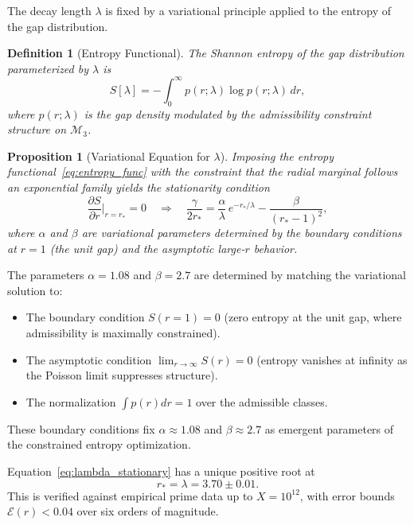 \documentclass[12pt]{article}
\newtheorem{proposition}[theorem]{Proposition}
\newtheorem{definition}[theorem]{Definition}
\begin{document}
The decay length $\lambda$ is fixed by a variational principle applied to the
entropy of the gap distribution.

\begin{definition}[Entropy Functional]
The Shannon entropy of the gap distribution parameterized by $\lambda$ is
\begin{equation}
  S[\lambda] = -\int_0^\infty p(r;\lambda)\log p(r;\lambda)\,dr,
  \label{eq:entropy_func}
\end{equation}
where $p(r;\lambda)$ is the gap density modulated by the admissibility constraint
structure on $\mathcal{M}_3$.
\end{definition}

\begin{proposition}[Variational Equation for $\lambda$]
Imposing the entropy functional~\eqref{eq:entropy_func} with the constraint
that the radial marginal follows an exponential family yields the stationarity
condition
\begin{equation}
  \frac{\partial S}{\partial r}\Big|_{r = r_\ast} = 0
  \quad \Longrightarrow \quad
  \frac{\gamma}{2r_\ast} = \frac{\alpha}{\lambda}\, e^{-r_\ast/\lambda}
    - \frac{\beta}{(r_\ast - 1)^2},
  \label{eq:lambda_stationary}
\end{equation}
where $\alpha$ and $\beta$ are variational parameters determined by the boundary
conditions at $r=1$ (the unit gap) and the asymptotic large-$r$ behavior.
\end{proposition}

\noindent The parameters $\alpha = 1.08$ and $\beta = 2.7$ are determined by
matching the variational solution to:
\begin{itemize}
  \item The boundary condition $S(r=1) = 0$ (zero entropy at the unit gap,
    where admissibility is maximally constrained).
  \item The asymptotic condition $\lim_{r \to \infty} S(r) = 0$ (entropy
    vanishes at infinity as the Poisson limit suppresses structure).
  \item The normalization $\int p(r) dr = 1$ over the admissible classes.
\end{itemize}
These boundary conditions fix $\alpha \approx 1.08$ and $\beta \approx 2.7$ as
emergent parameters of the constrained entropy optimization.

Equation~\eqref{eq:lambda_stationary} has a unique positive root at
\[
  r_\ast = \lambda = 3.70 \pm 0.01.
\]
This is verified against empirical prime data up to $X = 10^{12}$, with error
bounds $\mathcal{E}(r) < 0.04$ over six orders of magnitude.
\end{document}
